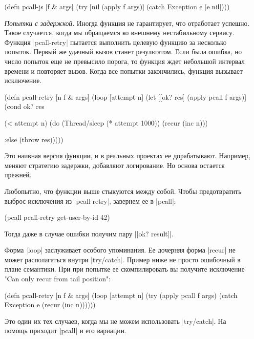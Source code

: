 \begin{code}
(defn pcall-js
  [f & args]
  (try
    [nil (apply f args)]
    (catch Exception e
      [e nil])))
\end{code}

\emph{Попытки с задержкой.} Иногда функция не гарантирует, что отработает
успешно. Такое случается, когда мы обращаемся ко внешнему нестабильному
сервису. Функция \spverb|pcall-retry| пытается выполнить целевую функцию за несколько
попыток. Первый же удачный вызов станет результатом. Если была ошибка, но число
попыток еще не превысило порога, то функция ждет небольшой интервал времени и
повторяет вызов. Когда все попытки закончились, функция вызывает исключение.

\begin{code}
(defn pcall-retry
  [n f & args]
  (loop [attempt n]
    (let [[ok? res] (apply pcall f args)]
      (cond
        ok? res

        (< attempt n)
        (do
          (Thread/sleep (* attempt 1000))
          (recur (inc n)))

        :else
        (throw res)))))
\end{code}

Это наивная версия функции, и в реальных проектах ее дорабатывают. Например,
меняют стратегию задержки, добавляют логирование. Но основа остается прежней.

Любопытно, что функции выше стыкуются между собой. Чтобы предотвратить выброс
исключения из \spverb|pcall-retry|, завернем ее в \spverb|pcall|:

\begin{code}
(pcall pcall-retry get-user-by-id 42)
\end{code}

Тогда даже в случае ошибки получим пару \spverb|[ok? result]|.

Форма \spverb|loop| заслуживает особого упоминания. Ее дочерняя форма \spverb|recur| не может
располагаться внутри \spverb|try/catch|. Пример ниже не просто ошибочный в плане
семантики. При при попытке ее скомпилировать вы получите исключение "Can only
recur from tail position":

\begin{code}
(defn pcall-retry
  [n f & args]
  (loop [attempt n]
    (try
      (apply pcall f args)
      (catch Exception e
        (recur (inc n))))))
\end{code}

Это один их тех случаев, когда мы не можем использовать \spverb|try/catch|. На помощь
приходит \spverb|pcall| и его вариации.


